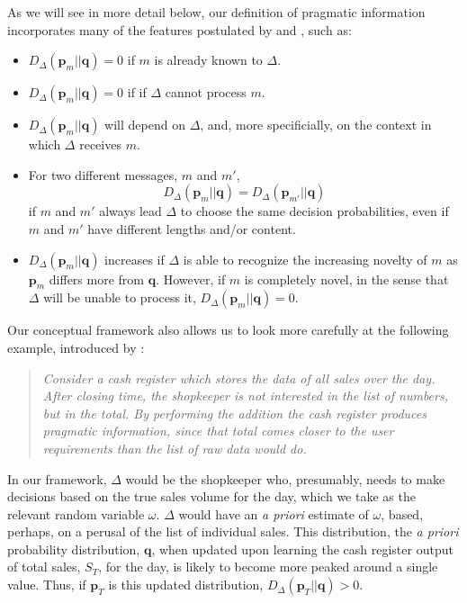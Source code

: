 \documentclass[11pt]{article}
\begin{document}
As we will see in more detail below, our definition of pragmatic information incorporates many of the features postulated by \cite{Weizaeker} and \cite{Gernert}, such as:
\begin{itemize}
\item $D_\Delta(\mathbf p_m || \mathbf q) = 0$ if $m$ is already known to $\Delta$.
\item $D_\Delta(\mathbf p_m || \mathbf q) = 0$ if  if $\Delta$ cannot process $m$.
\item $D_\Delta(\mathbf p_m || \mathbf q)$ will depend on $\Delta$, and, more specificially, on the context in which $\Delta$ receives $m$.
\item For two different messages, $m$ and $m'$, 
$$
D_\Delta(\mathbf p_m || \mathbf q) = D_\Delta(\mathbf p_{m'} || \mathbf q)
$$
if $m$ and $m'$ always lead $\Delta$ to choose the same decision probabilities, even if $m$ and $m'$ have different lengths and/or content.
\item $D_\Delta(\mathbf p_m || \mathbf q)$ increases if $\Delta$ is able to recognize the increasing novelty of $m$ as $\mathbf p_m$ differs more from $\mathbf q$.  However, if $m$ is completely novel, in the sense that $\Delta$ will be unable to process it, $D_\Delta(\mathbf p_m || \mathbf q) = 0$. 
\end{itemize}

Our conceptual framework also allows us to look more carefully at the following example, introduced by \cite{Gernert}:
\begin{quote}
\it{Consider a cash
register which stores the data of all sales over the day. After closing time, the shopkeeper
is not interested in the list of numbers, but in the total. By performing the addition the
cash register produces pragmatic information, since that total comes closer to the user
requirements than the list of raw data would do.}
\end{quote}
In our framework, $\Delta$ would be the shopkeeper who, presumably, needs to make decisions based on the true sales volume for the day, which we take as the relevant random variable $\omega$.  $\Delta$ would have an {\it a priori} estimate of $\omega$, based, perhaps, on a perusal of the list of individual sales.  This distribution, the {\it a priori} probability distribution, $\mathbf q$,  
when updated upon learning the cash register output of total sales, $S_T$, for the day, is likely to become more peaked around a single value.  Thus, if
$\mathbf p_T$ is this updated distribution, $D_\Delta(\mathbf p_T || \mathbf q) > 0$.\\  
\end{document}
